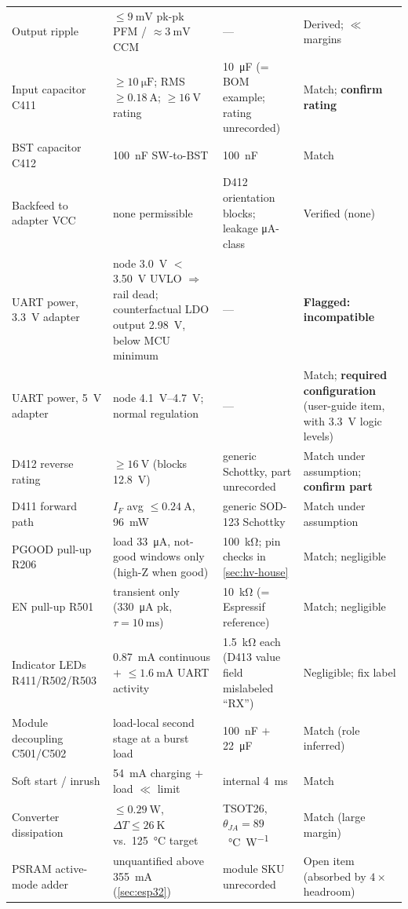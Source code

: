 \begin{longtable}{@{}p{}p{}p{}p{}@{}}
Output ripple & $\leq\SI{9}{\milli\volt}$ pk-pk PFM / $\approx\SI{3}{\milli\volt}$
  CCM & --- & Derived; $\ll$ margins \\
Input capacitor C411 & $\geq\SI{10}{\micro\farad}$; RMS $\geq\SI{0.18}{\ampere}$;
  $\geq\SI{16}{\volt}$ rating & \SI{10}{\micro\farad} (= BOM example; rating
  unrecorded) & Match; \textbf{confirm rating} \\
BST capacitor C412 & \SI{100}{\nano\farad} SW-to-BST & \SI{100}{\nano\farad} &
  Match \\
Backfeed to adapter VCC & none permissible & D412 orientation blocks; leakage
  \si{\micro\ampere}-class & Verified (none) \\
UART power, \SI{3.3}{\volt} adapter & node \SI{3.0}{\volt} $<$
  \SI{3.50}{\volt} UVLO $\Rightarrow$ rail dead; counterfactual LDO output
  \SI{2.98}{\volt}, below MCU minimum & --- & \textbf{Flagged: incompatible} \\
UART power, \SI{5}{\volt} adapter & node \SIrange{4.1}{4.7}{\volt}; normal
  regulation & --- & Match; \textbf{required configuration} (user-guide item,
  with 3.3~V logic levels) \\
D412 reverse rating & $\geq\SI{16}{\volt}$ (blocks \SI{12.8}{\volt}) & generic
  Schottky, part unrecorded & Match under assumption; \textbf{confirm part} \\
D411 forward path & $I_F$ avg $\leq\SI{0.24}{\ampere}$, \SI{96}{\milli\watt} &
  generic SOD-123 Schottky & Match under assumption \\
PGOOD pull-up R206 & load \SI{33}{\micro\ampere}, not-good windows only
  (high-Z when good) & \SI{100}{\kilo\ohm}; pin checks in \cref{sec:hv-house} &
  Match; negligible \\
EN pull-up R501 & transient only (\SI{330}{\micro\ampere} pk,
  $\tau=\SI{10}{\milli\second}$) & \SI{10}{\kilo\ohm} (= Espressif reference) &
  Match; negligible \\
Indicator LEDs R411/R502/R503 & \SI{0.87}{\milli\ampere} continuous $+$
  $\leq\SI{1.6}{\milli\ampere}$ UART activity & \SI{1.5}{\kilo\ohm} each
  (D413 value field mislabeled ``RX'') & Negligible; fix label \\
Module decoupling C501/C502 & load-local second stage at a burst load &
  \SI{100}{\nano\farad} $+$ \SI{22}{\micro\farad} & Match (role inferred) \\
Soft start / inrush & \SI{54}{\milli\ampere} charging $+$ load $\ll$ limit &
  internal \SI{4}{\milli\second} & Match \\
Converter dissipation & $\leq\SI{0.29}{\watt}$, $\Delta T \leq \SI{26}{\kelvin}$
  vs.\ \SI{125}{\celsius} target & TSOT26,
  $\theta_{JA}=89$~\si{\celsius\per\watt} & Match (large margin) \\
PSRAM active-mode adder & unquantified above \SI{355}{\milli\ampere}
  (\cref{sec:esp32}) & module SKU unrecorded & Open item (absorbed by
  $4\times$ headroom) \\
\end{longtable}

